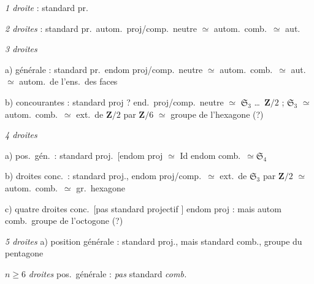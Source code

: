 \documentclass[11pt,a4paper]{article}
\begin{document}
\emph{1 droite} : standard pr.

\emph{2 droites} : standard pr.\ autom.\ proj/comp.\ neutre $\simeq$ autom.\ comb.\ $\simeq$ aut.\ \ill{}

\emph{3 droites}

a)  générale : standard pr.\ endom proj/comp.\ neutre $\simeq$ autom.\ comb.\ $\simeq$ aut.\ \ill{}  $\simeq$ autom.\ de l'ens.\ des  faces

b) concourantes : standard proj ? end.\ proj/comp.\ neutre $\simeq$  \struck{\ill{}} $\mathfrak{S}_3$ \ldots\ $\mathbf{Z}/2$ ;
\struck{\ill{}} $\mathfrak{S}_3$ $\simeq$ autom.\ comb.\ $\simeq$ ext.\ de $\mathbf{Z}/2$ par $\mathbf{Z}/6$ $\simeq$ groupe de l'hexagone (?)

\emph{4 droites}

a) pos.\ gén.\ : standard proj.\ [endom proj $\simeq$ Id  endom comb.\ $\simeq \mathfrak{S}_4$

b)  droites conc.\ : standard proj., endom proj/comp.\ $\simeq$ ext.\ de $\mathfrak{S}_3$ par $\mathbf{Z}/2$ $\simeq$  autom.\ comb.\ $\simeq$ gr.\ hexagone

c) quatre droites conc.\ [pas standard projectif  ] endom proj : \ill{} mais autom comb.\ groupe de l'octogone (?)

\emph{5 droites} a) position générale :  standard proj., mais standard comb.,  groupe du pentagone

$n \geqslant 6$ \emph{droites} pos.\ générale : \emph{pas} standard \emph{comb.}
\end{document}
